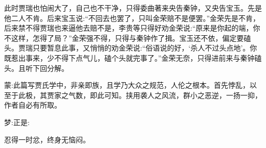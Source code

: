 \begin{parag}
    此时贾瑞也怕闹大了，自己也不干净，只得委曲著来央告秦钟，又央告宝玉。先是他二人不肯。后来宝玉说:“不回去也罢了，只叫金荣赔不是便罢。”金荣先是不肯，后来禁不得贾瑞也来逼他去赔不是，李贵等只得好劝金荣说:“原来是你起的端，你不这样，怎得了局？”金荣强不得，只得与秦钟作了揖。宝玉还不依，偏定要磕头。贾瑞只要暂息此事，又悄悄的劝金荣说:“俗语说的好，‘杀人不过头点地’。你既惹出事来，少不得下点气儿，磕个头就完事了。”金荣无奈，只得进前来与秦钟磕头。且听下回分解。
\end{parag}


\begin{parag}
    \begin{note}蒙:此篇写贾氏学中，非亲即族，且学乃大众之规范，人伦之根本。首先悖乱，以至于此极，其贾家之气数，即此可知。挟用袭人之风流，群小之恶逆，一扬一抑，作者自必有所取。\end{note}
\end{parag}


\begin{parag}
    \begin{note}梦:正是:\end{note}
\end{parag}


\begin{parag}
    \begin{note}忍得一时忿，终身无恼闷。\end{note}
\end{parag}

